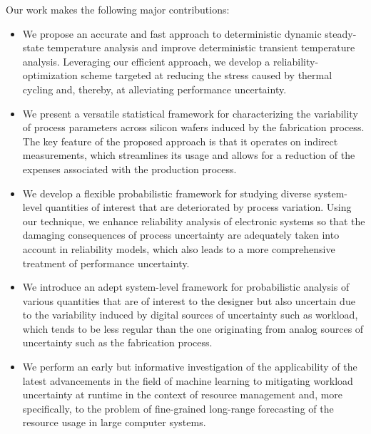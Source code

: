 Our work makes the following major contributions:

\begin{itemize}

\item
We propose an accurate and fast approach to deterministic dynamic steady-state
temperature analysis and improve deterministic transient temperature analysis.
Leveraging our efficient approach, we develop a reliability-optimization scheme
targeted at reducing the stress caused by thermal cycling and, thereby, at
alleviating performance uncertainty.

\item
We present a versatile statistical framework for characterizing the variability
of process parameters across silicon wafers induced by the fabrication process.
The key feature of the proposed approach is that it operates on indirect
measurements, which streamlines its usage and allows for a reduction of the
expenses associated with the production process.

\item
We develop a flexible probabilistic framework for studying diverse system-level
quantities of interest that are deteriorated by process variation. Using our
technique, we enhance reliability analysis of electronic systems so that the
damaging consequences of process uncertainty are adequately taken into account
in reliability models, which also leads to a more comprehensive treatment of
performance uncertainty.

\item
We introduce an adept system-level framework for probabilistic analysis of
various quantities that are of interest to the designer but also uncertain due
to the variability induced by digital sources of uncertainty such as workload,
which tends to be less regular than the one originating from analog sources of
uncertainty such as the fabrication process.

\item
We perform an early but informative investigation of the applicability of the
latest advancements in the field of machine learning to mitigating workload
uncertainty at runtime in the context of resource management and, more
specifically, to the problem of fine-grained long-range forecasting of the
resource usage in large computer systems.

\end{itemize}
